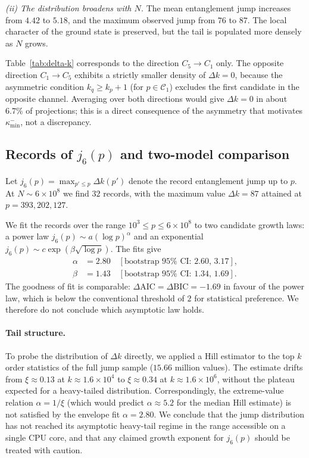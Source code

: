 \documentclass[11pt]{amsart}
\numberwithin{equation}{section}
\newcommand{\kminm}{\kappa_{\min}^{-}}
\newcommand{\Cone}{\mathcal{C}_1}
\theoremstyle{plain}
\theoremstyle{definition}
\begin{document}
\emph{(ii) The distribution broadens with $N$.} The mean entanglement
jump increases from $4.42$ to $5.18$, and the maximum observed jump
from $76$ to $87$. The local character of the ground state is
preserved, but the tail is populated more densely as $N$ grows.

Table~\ref{tab:delta-k} corresponds to the direction $C_5\to C_1$
only. The opposite direction $C_1\to C_5$ exhibits a strictly smaller
density of $\Delta k=0$, because the asymmetric condition
$k_q\ge k_p+1$ (for $p\in\Cone$) excludes the first candidate in the
opposite channel. Averaging over both directions would give
$\Delta k=0$ in about $6.7\%$ of projections; this is a direct
consequence of the asymmetry that motivates $\kminm$, not a
discrepancy.

\subsection{Records of \texorpdfstring{$j_6(p)$}{j\_6(p)} and two-model comparison}
\label{subsec:j6-growth}

Let $j_6(p)=\max_{p'\le p}\Delta k(p')$ denote the record entanglement
jump up to $p$. At $N\sim 6\times 10^8$ we find $32$ records, with
the maximum value $\Delta k=87$ attained at $p=393{,}202{,}127$.

We fit the records over the range $10^3\le p\le 6\times 10^8$ to two
candidate growth laws: a power law $j_6(p)\sim a(\log p)^\alpha$ and
an exponential $j_6(p)\sim c\exp(\beta\sqrt{\log p})$. The fits give
\begin{align}
\alpha &= 2.80 \quad[\text{bootstrap }95\%\text{ CI: }2.60,\,3.17],
\label{eq:j6-alpha}\\
\beta  &= 1.43 \quad[\text{bootstrap }95\%\text{ CI: }1.34,\,1.69].
\label{eq:j6-beta}
\end{align}
The goodness of fit is comparable: $\Delta\mathrm{AIC}=\Delta\mathrm{BIC}
=-1.69$ in favour of the power law, which is below the conventional
threshold of $2$ for statistical preference. We therefore do not
conclude which asymptotic law holds.

\paragraph{Tail structure.}
To probe the distribution of $\Delta k$ directly, we applied a Hill
estimator to the top $k$ order statistics of the full jump sample
($15.66$ million values). The estimate drifts from
$\xi\approx 0.13$ at $k\approx 1.6\times 10^4$ to
$\xi\approx 0.34$ at $k\approx 1.6\times 10^6$, without the plateau
expected for a heavy-tailed distribution. Correspondingly, the
extreme-value relation $\alpha=1/\xi$ (which would predict
$\alpha\approx 5.2$ for the median Hill estimate) is not satisfied by
the envelope fit $\alpha=2.80$. We conclude that the jump distribution
has not reached its asymptotic heavy-tail regime in the range
accessible on a single CPU core, and that any claimed growth exponent
for $j_6(p)$ should be treated with caution.
\end{document}
